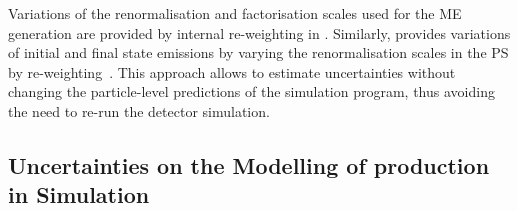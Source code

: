Variations of the renormalisation and factorisation scales used for the ME
generation are provided by internal re-weighting in \POWHEGBOX[v2]. Similarly,
\PYTHIA[8] provides variations of initial and final state emissions by varying
the renormalisation scales in the PS by
re-weighting~\cite{Mrenna:2016sih,pythia-variations-online}. This approach
allows to estimate uncertainties without changing the particle-level predictions
of the simulation program, thus avoiding the need to re-run the detector
simulation.


\subsection{Uncertainties on the Modelling of \Zjets production in Simulation}%
\label{app:zjets_uncertainties}

